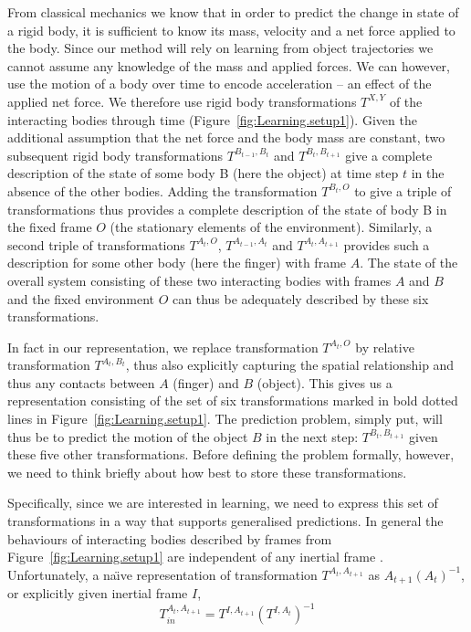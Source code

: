From classical mechanics we know that in order to predict the change
in state of a rigid body, it is sufficient to know its mass, velocity
and a net force applied to the body.  Since our method will rely on
learning from object trajectories we cannot assume any knowledge of
the mass and applied forces. We can however, use the motion of a body over time to encode acceleration -- an effect of the applied net
force. We therefore use rigid body transformations $T^{X,Y}$ of the interacting bodies through time (Figure~\ref{fig:Learning.setup1}). Given the additional assumption that the net force and the body mass are constant, two subsequent rigid body transformations $T^{B_{t-1},
  B_{t}}$ and $T^{B_{t},B_{t+1}}$ give a complete description of the
state of some body B (here the object) at time step $t$ in the absence
of the other bodies.  Adding the transformation $T^{B_t, O}$ to give a
triple of transformations thus provides a complete description of the
state of body B in the fixed frame $O$ (the stationary elements of the
environment).  Similarly, a second triple of transformations $T^{A_t,
  O}$, $T^{A_{t-1}, A_{t}}$ and $T^{A_{t}, A_{t+1}}$ provides such a
description for some other body (here the finger) with frame $A$. 
The state of the overall system consisting of these two interacting
bodies with frames $A$ and $B$ and the fixed environment $O$ can
thus be adequately described by these six transformations.

In fact in our representation, we replace transformation $T^{A_t, O}$ by relative transformation $T^{A_t, B_t}$, thus also explicitly capturing the spatial relationship and thus any contacts between $A$ (finger) and $B$ (object). This gives us a representation consisting of the set of six transformations marked in bold dotted lines in Figure~\ref{fig:Learning.setup1}. The prediction problem, simply put, will thus be to predict the motion of the object $B$ in the next step: $T^{B_t,B_{t+1}}$ given these five other transformations. Before defining the problem formally, however, we need to think briefly about how best to store these transformations.

Specifically, since we are interested in learning, we need to express this set of transformations in a way that supports generalised predictions. In general the behaviours of interacting bodies described by frames from Figure~\ref{fig:Learning.setup1} are independent of any inertial frame \cite{kopicki_prediction_2010}. Unfortunately, a na\"{\i}ve representation of transformation $T^{A_{t}, A_{t+1}}$ as $A_{t+1}(A_{t})^{-1}$, or explicitly given inertial frame $I$,
\begin{equation}
T_{in}^{A_{t}, A_{t+1}} = T^{I, A_{t+1}} (T^{I, A_{t}})^{-1}
\label{eq:Learning.In1}
\end{equation}

